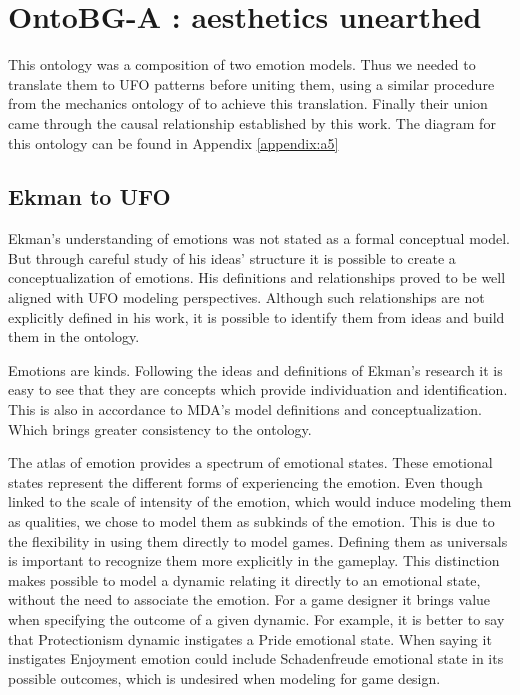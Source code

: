 \section{OntoBG-A : aesthetics unearthed}

This ontology was a composition of two emotion models. Thus we needed to translate them to UFO patterns before uniting them, using a similar procedure from the mechanics ontology of \cite{kritz_buildingOntology} to achieve this translation. Finally their union came through the causal relationship established by this work. The diagram for this ontology can be found in Appendix \autoref{appendix:a5}

\subsection{Ekman to UFO}
Ekman's understanding of emotions was not stated as a formal conceptual model. But through careful study of his ideas' structure it is possible to create a conceptualization of emotions. His definitions and relationships proved to be well aligned with UFO modeling perspectives. Although such relationships are not explicitly defined in his work, it is possible to identify them from ideas and build them in the ontology.

Emotions are kinds. Following the ideas and definitions of Ekman's research it is easy to see that they are concepts which provide individuation and identification. This is also in accordance to MDA's model definitions and conceptualization. Which brings greater consistency to the ontology.

The atlas of emotion provides a spectrum of emotional states. These emotional states represent the different forms of experiencing the emotion. Even though linked to the scale of intensity of the emotion, which would induce modeling them as qualities, we chose to model them as subkinds of the emotion. This is due to the flexibility in using them directly to model games. Defining them as universals is important to recognize them more explicitly in the gameplay. This distinction makes possible to model a dynamic relating it directly to an emotional state, without the need to associate the emotion. For a game designer it brings value when specifying the outcome of a given dynamic. For example, it is better to say that Protectionism dynamic instigates a Pride emotional state. When saying it instigates Enjoyment emotion could include Schadenfreude emotional state in its possible outcomes, which is undesired when modeling for game design.

